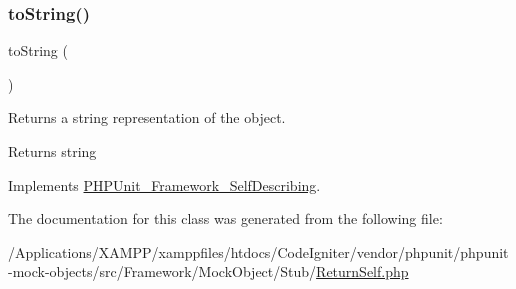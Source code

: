 \subsubsection{\texorpdfstring{to\+String()}{toString()}}
{\footnotesize\ttfamily to\+String (\begin{DoxyParamCaption}{ }\end{DoxyParamCaption})}

Returns a string representation of the object.

\begin{DoxyReturn}{Returns}
string 
\end{DoxyReturn}


Implements \mbox{\hyperlink{interface_p_h_p_unit___framework___self_describing_a5558c5d549f41597377fa1ea8a1cefa3}{P\+H\+P\+Unit\+\_\+\+Framework\+\_\+\+Self\+Describing}}.



The documentation for this class was generated from the following file\+:\begin{DoxyCompactItemize}
\item 
/\+Applications/\+X\+A\+M\+P\+P/xamppfiles/htdocs/\+Code\+Igniter/vendor/phpunit/phpunit-\/mock-\/objects/src/\+Framework/\+Mock\+Object/\+Stub/\mbox{\hyperlink{_return_self_8php}{Return\+Self.\+php}}\end{DoxyCompactItemize}
